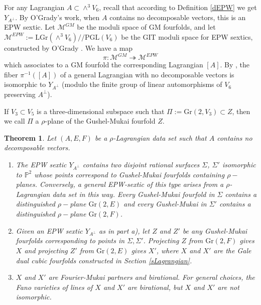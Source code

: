 \documentclass[11pt]{amsart}
\theoremstyle{plain}
\newtheorem{theorem}{Theorem}[section]
\numberwithin{equation}{section}
\theoremstyle{definition}
\theoremstyle{remark}
\newcommand{\bP}{\mathbb{P}}
\newcommand{\calM}{\mathcal{M}}
\newcommand{\PGL}{\mathrm{PGL}}
\begin{document}
For any Lagrangian $A\subset \wedge^3 V_6$, recall that according to Definition \ref{dEPW} we get $Y_{A^\perp}$. By O'Grady's work, when $A$ contains no decomposable vectors, this is an EPW sextic. Let $\calM^{GM}$ be the moduli space of GM fourfolds, and let $\calM^{EPW}:= \mathrm{LGr}(\wedge^3 V_6)//\PGL(V_6)$ be the GIT moduli space for EPW sextics, constructed by O'Grady \cite{OG16}. We have a map
$$\pi:\calM^{GM}\twoheadrightarrow \calM^{EPW}$$ which associates to a GM fourfold the corresponding Lagrangian $[A]$. By \cite{DK3}, the fiber $\pi^{-1}([A])$ of a general Lagrangian with no decomposable vectors is isomorphic to $Y_{A^\perp}$ (modulo the finite group of linear automorphisms of $V_6$ preserving $A^\perp$).

If $V_3 \subset V_5$ is a three-dimensional subspace such that $\Pi:=\mathrm{Gr}(2, V_3) \subset Z$, then we call $\Pi$ a $\rho$-plane of the Gushel-Mukai fourfold $Z$. 
    

\begin{theorem}\label{tConnectionToGMs}
Let $(A, E, F)$ be a $\rho$-Lagrangian data set such that $A$ contains no decomposable vectors.
\begin{enumerate}
\item
The EPW sextic $Y_{A^{\perp}}$ contains two disjoint rational surfaces $\Sigma$, $\Sigma' $ isomorphic to $\bP^2$ whose points correspond to Gushel-Mukai fourfolds containing $\rho-$planes. Conversely, a general EPW-sextic of this type arises from a $\rho$-Lagrangian data set in this way. Every Gushel-Mukai fourfold in $\Sigma$ contains a distinguished $\rho-$plane $\mathrm{Gr}(2, E)$ and every Gushel-Mukai in $\Sigma'$ contains a distinguished $\rho-$plane  $\mathrm{Gr}(2, F)$.

\item 
Given an EPW sextic $Y_{A^{\perp}}$ as in part a), let $Z$ and $Z'$ be any Gushel-Mukai fourfolds corresponding to points in $\Sigma, \Sigma'$. Projecting $Z$ from $\mathrm{Gr}(2, F)$ gives $X$ and projecting $Z'$ from $\mathrm{Gr}(2, E)$ gives $X'$, where $X$ and $X'$ are the Gale dual cubic fourfolds constructed in Section \ref{sLagrangian}. 
\item 
$X$ and $X'$ are Fourier-Mukai partners and birational. For general choices, the Fano varieties of lines of $X$ and $X'$ are birational, but $X$ and $X'$ are not isomorphic. 
\end{enumerate}
\end{theorem}
\end{document}
